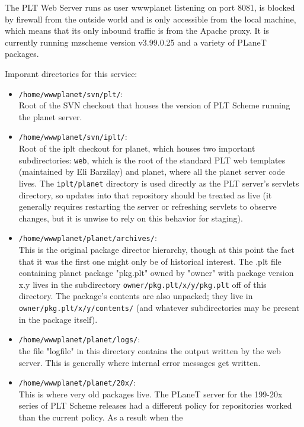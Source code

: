 \documentclass{article}
\begin{document}
The PLT Web Server runs as user wwwplanet listening on port 8081, is
blocked by firewall from the outside world and is only accessible from
the local machine, which means that its only inbound traffic is from
the Apache proxy. It is currently running mzscheme version v3.99.0.25
and a variety of PLaneT packages.

Imporant directories for this service:

\begin{itemize}
\item \texttt{/home/wwwplanet/svn/plt/}: \\
Root of the SVN checkout that houses the version of PLT Scheme running
the planet server.

\item \texttt{/home/wwwplanet/svn/iplt/}: \\
Root of the iplt checkout for planet, which houses two important
  subdirectories: \texttt{web}, which is the root of the standard PLT web
  templates (maintained by Eli Barzilay) and planet, where all the
  planet server code lives. The \texttt{iplt/planet} directory is used directly
  as the PLT server's servlets directory, so updates into that
  repository should be treated as live (it generally requires
  restarting the server or refreshing servlets to observe changes, but
  it is unwise to rely on this behavior for staging).
\item \texttt{/home/wwwplanet/planet/archives/}: \\
This is the original package director hierarchy, though at this point
  the fact that it was the first one might only be of historical
  interest. The .plt file containing planet package "pkg.plt" owned by
  "owner" with package version x.y lives in the subdirectory
  \texttt{owner/pkg.plt/x/y/pkg.plt} off of this directory. The package's
  contents are also unpacked; they live in \texttt{owner/pkg.plt/x/y/contents/}
  (and whatever subdirectories may be present in the package itself).
\item \texttt{/home/wwwplanet/planet/logs/}: \\
the file "logfile" in this directory contains the output written by
  the web server. This is generally where internal error messages
  get written.
\item \texttt{/home/wwwplanet/planet/20x/}: \\
This is where very old packages live. The PLaneT server for the
  199-20x series of PLT Scheme releases had a different policy for
  repositories worked than the current policy. As a result when the

\end{itemize}
\end{document}
